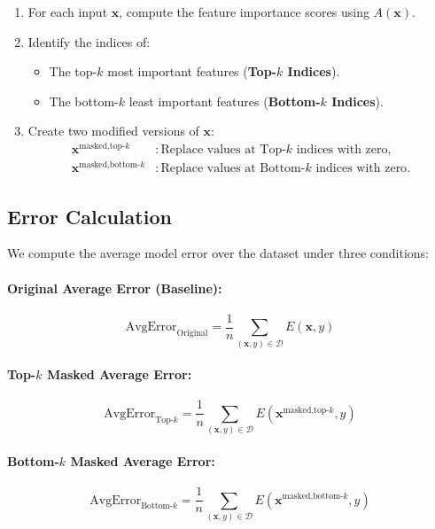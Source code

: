 \documentclass{article}
\theoremstyle{plain}
\theoremstyle{definition}
\theoremstyle{remark}
\begin{document}
\begin{enumerate}
    \item For each input $\mathbf{x}$, compute the feature importance scores using $A(\mathbf{x})$.
    \item Identify the indices of:
    \begin{itemize}
        \item The top-$k$ most important features (\textbf{Top-$k$ Indices}).
        \item The bottom-$k$ least important features (\textbf{Bottom-$k$ Indices}).
    \end{itemize}
    \item Create two modified versions of $\mathbf{x}$:
    \begin{align*}
        \mathbf{x}^{\text{masked,top-}k} &: \text{Replace values at Top-$k$ indices with zero}, \\
        \mathbf{x}^{\text{masked,bottom-}k} &: \text{Replace values at Bottom-$k$ indices with zero}.
    \end{align*}
\end{enumerate}

\subsection{Error Calculation}
We compute the average model error over the dataset under three conditions:

\paragraph{Original Average Error (Baseline):}
\[
\text{AvgError}_{\text{Original}} = \frac{1}{n} \sum_{(\mathbf{x}, y) \in \mathcal{D}} E(\mathbf{x}, y)
\]

\paragraph{Top-$k$ Masked Average Error:}
\[
\text{AvgError}_{\text{Top-}k} = \frac{1}{n} \sum_{(\mathbf{x}, y) \in \mathcal{D}} E(\mathbf{x}^{\text{masked,top-}k}, y)
\]

\paragraph{Bottom-$k$ Masked Average Error:}
\[
\text{AvgError}_{\text{Bottom-}k} = \frac{1}{n} \sum_{(\mathbf{x}, y) \in \mathcal{D}} E(\mathbf{x}^{\text{masked,bottom-}k}, y)
\]
\end{document}
